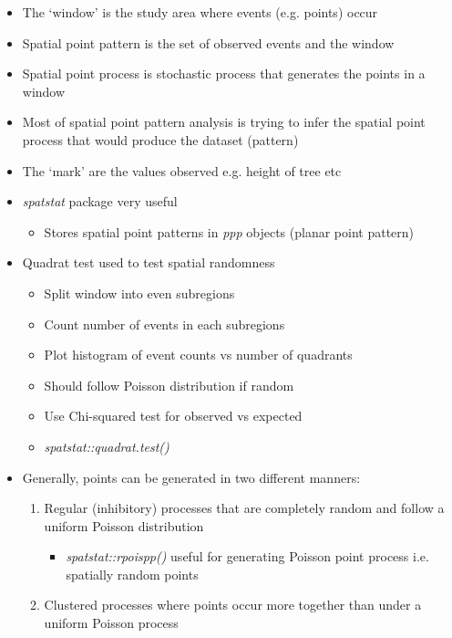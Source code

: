 \documentclass{article}
\begin{document}
\begin{itemize}
    \item The `window' is the study area where events (e.g. points) occur
    \item Spatial point pattern is the set of observed events and the window
    \item Spatial point process is stochastic process that generates the points in a window
    \item Most of spatial point pattern analysis is trying to infer the spatial point process that would produce the dataset (pattern)
    \item The `mark' are the values observed e.g. height of tree etc
    \item \textit{spatstat} package very useful
    \begin{itemize}
        \item Stores spatial point patterns in \textit{ppp} objects (planar point pattern)
    \end{itemize}
    \item Quadrat test used to test spatial randomness
    \begin{itemize}
        \item Split window into even subregions
        \item Count number of events in each subregions 
        \item Plot histogram of event counts vs number of quadrants
        \item Should follow Poisson distribution if random
        \item Use Chi-squared test for observed vs expected
        \item \textit{spatstat::quadrat.test()}
    \end{itemize}
    \item Generally, points can be generated in two different manners:
    \begin{enumerate}
        \item Regular (inhibitory) processes that are completely random and follow a uniform Poisson distribution
        \begin{itemize}
            \item \textit{spatstat::rpoispp()} useful for generating Poisson point process i.e. spatially random points
        \end{itemize}
        \item Clustered processes where points occur more together than under a uniform Poisson process
        \begin{itemize}

\end{itemize}
\end{enumerate}
\end{itemize}
\end{document}
